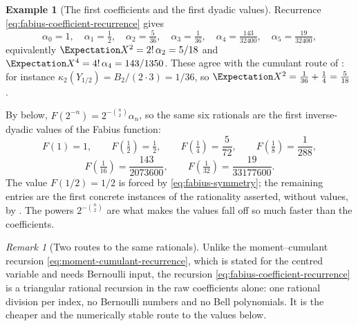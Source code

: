 \documentclass[11pt,a4paper,oneside,openany]{book}
\theoremstyle{definition}
\newtheorem{example}[example]{Example}
\theoremstyle{remark}
\newtheorem{remark}[remark]{Remark}
\begin{document}
\begin{example}[The first coefficients and the first dyadic values]\label{ex:fabius-first-coefficients}
Recurrence \eqref{eq:fabius-coefficient-recurrence} gives
\[
 \alpha_0=1,\quad
 \alpha_1=\tfrac12,\quad
 \alpha_2=\tfrac5{36},\quad
 \alpha_3=\tfrac1{36},\quad
 \alpha_4=\tfrac{143}{32400},\quad
 \alpha_5=\tfrac{19}{32400},
\]
equivalently $\Expectation X^2=2!\,\alpha_2=5/18$ and $\Expectation X^4=4!\,\alpha_4=143/1350$.
These agree with the cumulant route of
: for instance
$\kappa_2(Y_{1/2})=B_2/(2\cdot3)=1/36$, so $\Expectation X^2=\tfrac1{36}+\tfrac14=\tfrac5{18}$.

By  below, $F(2^{-n})=2^{-\binom n2}\alpha_n$, so the same
six rationals are the first inverse-dyadic values of the Fabius function:
\[
 F(1)=1,\qquad
 F\!\left(\tfrac12\right)=\tfrac12,\qquad
 F\!\left(\tfrac14\right)=\frac5{72},\qquad
 F\!\left(\tfrac18\right)=\frac1{288},
\]
\[
 F\!\left(\tfrac1{16}\right)=\frac{143}{2073600},\qquad
 F\!\left(\tfrac1{32}\right)=\frac{19}{33177600}.
\]
The value $F(1/2)=1/2$ is forced by \eqref{eq:fabius-symmetry}; the remaining entries
are the first concrete instances of the rationality asserted, without values, by
.  The powers $2^{-\binom n2}$ are what makes the values
fall off so much faster than the coefficients.
\end{example}

\begin{remark}[Two routes to the same rationals]\label{rem:moment-routes}
Unlike the moment--cumulant recursion \eqref{eq:moment-cumulant-recurrence}, which is
stated for the centred variable and needs Bernoulli input, the recursion
\eqref{eq:fabius-coefficient-recurrence} is a triangular rational recursion in the raw
coefficients alone: one rational division per index, no Bernoulli numbers and no Bell
polynomials.  It is the cheaper and the numerically stable route to the values below.
\end{remark}
\end{document}
